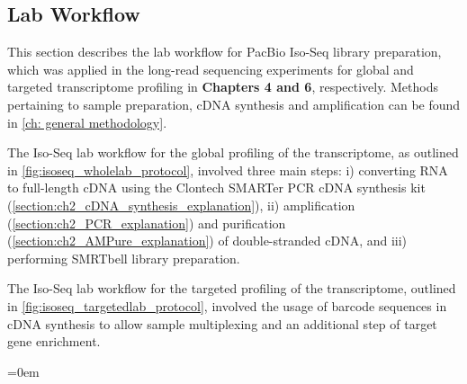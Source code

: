 \subsection{Lab Workflow}
\label{chap:isoseq_labpipeline}
This section describes the lab workflow for PacBio Iso-Seq library preparation, which was applied in the long-read sequencing experiments for global and targeted transcriptome profiling in \textbf{Chapters 4 and 6}, respectively. Methods pertaining to sample preparation, cDNA synthesis and amplification can be found in \cref{ch: general methodology}.

The Iso-Seq lab workflow for the global profiling of the transcriptome, as outlined in \cref{fig:isoseq_wholelab_protocol}, involved three main steps: i) converting RNA to full-length cDNA using the Clontech SMARTer PCR cDNA synthesis kit (\cref{section:ch2_cDNA_synthesis_explanation}), ii) amplification (\cref{section:ch2_PCR_explanation}) and purification (\cref{section:ch2_AMPure_explanation}) of double-stranded cDNA, and iii) performing SMRTbell library preparation. 

The Iso-Seq lab workflow for the targeted profiling of the transcriptome, outlined in \cref{fig:isoseq_targetedlab_protocol}, involved the usage of barcode sequences in cDNA synthesis to allow sample multiplexing and an additional step of target gene enrichment.

\vspace{3cm}
\begingroup
\parindent=0em
\localtableofcontents 
\endgroup

